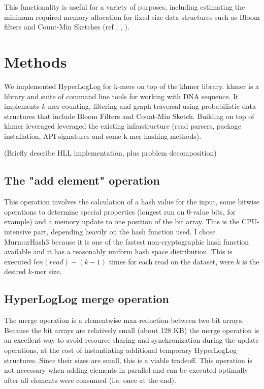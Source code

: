 \documentclass{bioinfo}
\begin{document}
This functionality is useful for a variety of purposes, including
estimating the minimum required memory allocation for fixed-size data
structures such as Bloom filters and Count-Min Sketches (ref \citep{pell2012scaling},
\citep{georganas2014parallel}, \citep{khmer-counting}).




\section{Methods}

We implemented HyperLogLog for k-mers on top of the khmer library.
khmer is a library and suite of command line tools for working with
DNA sequence.  It implements $k$-mer counting, filtering and graph
traversal using probabilistic data structures that include Bloom
Filters and Count-Min Sketch.  Building on top of khmer leveraged
leveraged the existing infrastructure (read parsers, package
installation, API signatures and some k-mer hashing methods).

(Briefly describe HLL implementation, plus problem decomposition)

\subsection{The "add element" operation}

This operation involves the calculation of a hash value for the input,
some bitwise operations to determine special properties (longest run on 0-value bits, for example)
and a memory update to one position of the bit array.
This is the CPU-intensive part,
depending heavily on the hash function used.
I chose MurmurHash3 because it is one of the fastest non-cryptographic hash function available
and it has a reasonably uniform hash space distribution.
This is executed $len(read) - (k-1)$ times for each read on the dataset,
were $k$ is the desired $k$-mer size.

\subsection{HyperLogLog merge operation}

The merge operation is a elementwise max-reduction between two bit arrays.
Because the bit arrays are relatively small (about 128 KB) the merge operation is an excellent way to avoid resource sharing and synchronization during the update operations,
at the cost of instantiating additional temporary HyperLogLog structures.
Since their sizes are small,
this is a viable tradeoff.
This operation is not necessary when adding elements in parallel and can be executed
optimally after all elements were consumed (i.e. once at the end).
\end{document}

